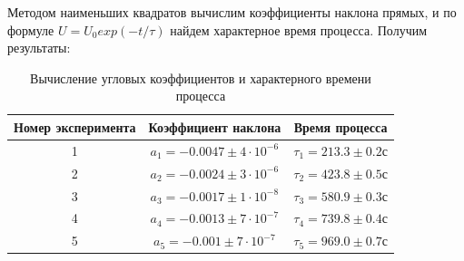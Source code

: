 \documentclass{article}
\begin{document}
\newpage
Методом наименьших квадратов вычислим коэффициенты наклона прямых, и по формуле $U = U_0exp(-t/\tau)$ найдем характерное время процесса. Получим результаты:
\begin{table}[h]
    \centering
    \begin{tabular}{|c|c|c|}
        \hline
        \textbf{Номер эксперимента} & \textbf{Коэффициент наклона} & \textbf{Время процесса}\\
        \hline
        1 & $a_1 = -0.0047 \pm 4 \cdot 10^{-6}$ & $\tau_{1} = 213.3 \pm 0.2 \text{с}$ \\
        \hline
        2 & $a_2 = -0.0024 \pm 3 \cdot 10^{-6}$ & $\tau_{2} = 423.8 \pm 0.5 \text{с}$ \\
        \hline
        3 & $a_3 = -0.0017 \pm 1 \cdot 10^{-8}$ & $\tau_{3} = 580.9 \pm 0.3 \text{с}$ \\
        \hline
        4 & $a_4 = -0.0013 \pm 7 \cdot 10^{-7}$ & $\tau_{4} = 739.8 \pm 0.4 \text{с}$ \\
        \hline
        5 & $a_5 = -0.001 \pm 7 \cdot 10^{-7}$  & $\tau_{5} = 969.0 \pm 0.7 \text{с}$ \\
        \hline
    \end{tabular}
    \caption{Вычисление угловых коэффициентов и характерного времени процесса}
    \label{tab:my_label}
\end{table}
    
\end{document}
